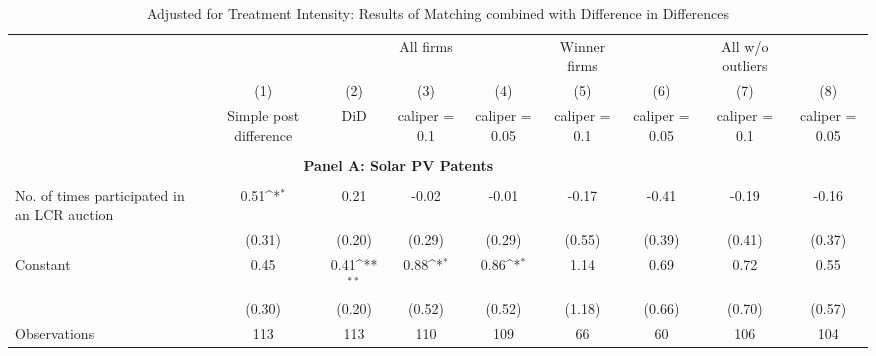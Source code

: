 \begin{table}[htbp]\centering \\  \def\sym#1{\ifmmode^{#1}\else\(^{#1}\)\fi} \\ \caption{Adjusted for Treatment Intensity: Results of Matching combined with Difference in Differences} \\ \begin{tabular}{l*{8}{c}} \hline\hline
                    &                     &                     &   All firms         &                     &Winner firms         &                     &All w/o outliers         &                     \\
                    &\multicolumn{1}{c}{(1)}&\multicolumn{1}{c}{(2)}&\multicolumn{1}{c}{(3)}&\multicolumn{1}{c}{(4)}&\multicolumn{1}{c}{(5)}&\multicolumn{1}{c}{(6)}&\multicolumn{1}{c}{(7)}&\multicolumn{1}{c}{(8)}\\
                    &\multicolumn{1}{c}{Simple post difference}&\multicolumn{1}{c}{DiD}&\multicolumn{1}{c}{caliper = 0.1}&\multicolumn{1}{c}{caliper = 0.05}&\multicolumn{1}{c}{caliper = 0.1}&\multicolumn{1}{c}{caliper = 0.05}&\multicolumn{1}{c}{caliper = 0.1}&\multicolumn{1}{c}{caliper = 0.05}\\
\hline \\ \multicolumn{8}{c}{\textbf{Panel A: Solar PV Patents}} \\\\[-1ex]
No. of times participated in an LCR auction&        0.51\sym{*}  &        0.21         &       -0.02         &       -0.01         &       -0.17         &       -0.41         &       -0.19         &       -0.16         \\
                    &      (0.31)         &      (0.20)         &      (0.29)         &      (0.29)         &      (0.55)         &      (0.39)         &      (0.41)         &      (0.37)         \\
[1em]
Constant            &        0.45         &        0.41\sym{**} &        0.88\sym{*}  &        0.86\sym{*}  &        1.14         &        0.69         &        0.72         &        0.55         \\
                    &      (0.30)         &      (0.20)         &      (0.52)         &      (0.52)         &      (1.18)         &      (0.66)         &      (0.70)         &      (0.57)         \\
\hline
Observations        &         113         &         113         &         110         &         109         &          66         &          60         &         106         &         104         \\

\end{tabular}
\end{table}
